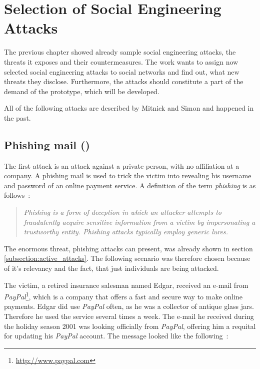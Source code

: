 \chapter{Selection of Social Engineering Attacks}
\label{chap:attacks}

The previous chapter showed already sample social engineering attacks, the
threats it exposes and their countermeasures. The work wants to assign now selected
social engineering attacks to social networks and find out, what new threats
they disclose. Furthermore, the attacks should constitute a part of the demand
of the prototype, which will be developed.

All of the following attacks are described by Mitnick and Simon
\cite{mitnick2003} and happened in the past.

\section[Phishing mail]{Phishing mail (\cite[pp. 97-100]{mitnick2003})}
\label{sec:phishing_mail}

The first attack is an attack against a private person, with no affiliation at
a company. A phishing mail is used to trick the victim into revealing his
username and password of an online payment service. A definition of the term
\textit{phishing} is as follows~\cite{jagatic2007}:

\begin{quote}
\textit{Phishing is a form of deception in which an attacker attempts to
fraudulently acquire sensitive information from a victim by impersonating a
trustworthy entity. Phishing attacks typically employ generic
\glqq{}lures\grqq{}.}
\end{quote}

The enormous threat, phishing attacks can present, was already shown in section
\ref{subsection:active_attacks}. The following scenario was therefore chosen
because of it's relevancy and the fact, that just individuals are being
attacked.

The victim, a retired insurance salesman named Edgar, received an e-mail from
\textit{PayPal}\footnote{\url{http://www.paypal.com}}, which is a company that
offers a fast and secure way to make online payments. Edgar did use
\textit{PayPal} often, as he was a collector of antique glass jars. Therefore
he used the service several times a week. The e-mail he received during the
holiday season 2001 was looking officially from \textit{PayPal}, offering him a
requital for updating his \textit{PayPal} account. The message looked like the
following~\cite[p. 97]{mitnick2003}:

